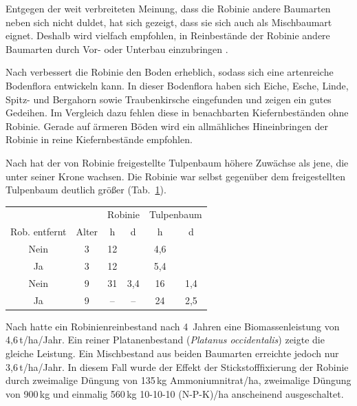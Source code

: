 \documentclass[twocolumn]{scrartcl}
\begin{document}
Entgegen der weit verbreiteten Meinung, dass die Robinie andere
Baumarten neben sich nicht duldet, hat sich gezeigt, dass sie sich
auch als Mischbaumart eignet. Deshalb wird vielfach empfohlen, in
Reinbestände der Robinie andere Baumarten durch Vor- oder Unterbau
einzubringen \citep{ewald2001klone}.

Nach \citet[S.~90--92]{erteld1952robinieErtrag} verbessert die Robinie
den Boden erheblich, sodass sich eine artenreiche Bodenflora
entwickeln kann. In dieser Bodenflora haben sich Eiche, Esche, Linde,
Spitz- und Bergahorn sowie Traubenkirsche eingefunden und zeigen ein
gutes Gedeihen. Im Vergleich dazu fehlen diese in benachbarten
Kiefernbeständen ohne Robinie. Gerade auf ärmeren Böden wird ein
allmähliches Hineinbringen der Robinie in reine Kiefernbestände
empfohlen.

Nach \citet{beck1974robinieTulpenbaum} hat der von Robinie
freigestellte Tulpenbaum höhere Zuwächse als jene, die unter seiner
Krone wachsen. Die Robinie war selbst gegenüber dem freigestellten
Tulpenbaum deutlich größer (Tab.~\ref{tab:tulpenbaumRobinie}).

\begin{table}[htbp]
\centering
\begin{tabular}{cccc|cc}
 &  & \multicolumn{2}{c}{Robinie} & \multicolumn{2}{c}{Tulpenbaum} \\
  Rob. entfernt &  Alter & h   & d &  h & d \\
  \hline
Nein         &      3 & 12 &   & 4,6 & \\
Ja           &      3 & 12 &   & 5,4 & \\
Nein         &      9 & 31 & 3,4 & 16 & 1,4 \\
Ja           &      9 & -- & --  & 24 & 2,5 \\
\end{tabular}
  \label{tab:tulpenbaumRobinie}
\end{table}

Nach \citet{dickmann1985robinieMischbestand} hatte ein
Robinienreinbestand nach 4~Jahren eine Biomassenleistung von
4,6\,t/ha/Jahr. Ein reiner Platanenbestand (\emph{Platanus
occidentalis}) zeigte die gleiche Leistung. Ein Mischbestand aus
beiden Baumarten erreichte jedoch nur 3,6\,t/ha/Jahr. In diesem Fall
wurde der Effekt der Stickstofffixierung der Robinie durch zweimalige
Düngung von 135\,kg Ammoniumnitrat/ha, zweimalige Düngung von 900\,kg
und einmalig 560\,kg 10-10-10 (N-P-K)/ha anscheinend ausgeschaltet.
\end{document}
